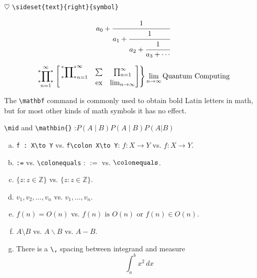 \documentclass[12pt]{amsart}
\theoremstyle{plain}
\theoremstyle{definition}
\theoremstyle{remark}
\numberwithin{equation}{section} %
\newcommand{\bbZ}{\mathbb{Z}}
\DeclareMathOperator{\ex}{ex}
\begin{document}
$\heartsuit$ \verb|\sideset{text}{right}{symbol}|

\[
	a_0+\cfrac{1}{a_1+\cfrac{1}{a_2+\cfrac{1}{a_3+\cdots}}}
\]

\begin{equation}
	\sideset{_\ast^\ast}{_\ast^\ast}\prod_{n=1}^{\infty} \left.	\begin{aligned}
		\begin{bmatrix}
			\sideset{_\ast^\ast}{_\ast^\ast}\prod_{n=1}^{\infty} & \sum & \prod_{n=1}^{\infty} \\
			                                                     & \ex  & \lim_{n\to \infty}
		\end{bmatrix}
	\end{aligned} \right \rbrace \lim_{n\to \infty} \text{Quantum Computing}
\end{equation}

The \verb|\mathbf| command is commonly used to obtain bold Latin letters in math, but for most other kinds of math symbols it has no effect.

\verb|\mid| and \verb|\mathbin{}|	:$ P(A \mid B) P(A \mathbin{\vert} B )  P(A | B)  $
\begin{enumerate}[(a)]
	\item \verb|f : X\to Y| vs. \verb|f\colon X\to Y|: $ f : X\to Y $ vs. $ f\colon X\to Y $.

	\item \verb|:=| vs. \verb|\colonequals| : $ :=  $ vs. $ \colonequals $.

	\item $ \lbrace z : z \in \bbZ \rbrace $ vs. $ \lbrace z \colon z \in \bbZ \rbrace $.

	\item $ v_{1}, v_{2}, \dotsc,v_{n} $ vs. $ v_{1},\dotsc,v_{n} $.

	\item $ f(n) = O(n) $ vs. $ f(n) \text{ is } O(n)$ or $ f(n)\in O(n) $.

	\item $ A\setminus B $ vs. $ A\backslash B $ vs. $ A-B $.

	\item There is a \verb|\,| spacing between integrand and measure
	      \[ \int_{a}^{b} x^2 \,dx \]
\end{enumerate}
\end{document}
